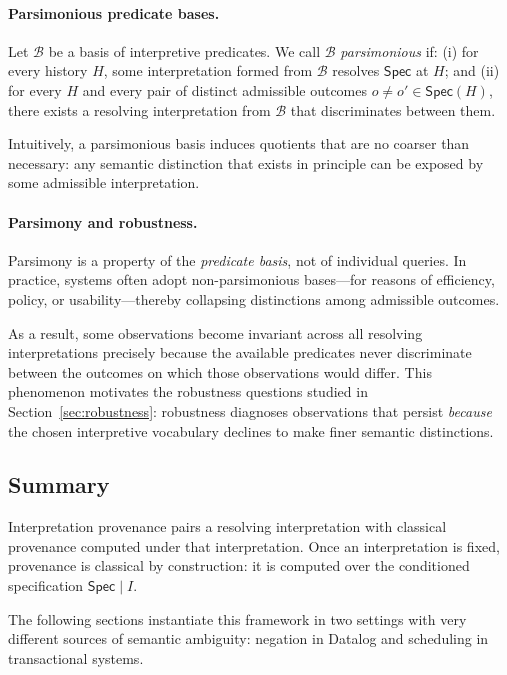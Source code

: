 \documentclass[acmsmall,nonacm]{acmart}
\theoremstyle{remark}
\numberwithin{definition}{section}
\numberwithin{theorem}{section}
\numberwithin{lemma}{section}
\numberwithin{corollary}{section}
\numberwithin{remark}{section}
\numberwithin{example}{section}
\numberwithin{observation}{section}
\numberwithin{assumption}{section}
\newcommand{\Spec}{\mathsf{Spec}}
\begin{document}
\paragraph{Parsimonious predicate bases.}
Let $\mathcal{B}$ be a basis of interpretive predicates.
We call $\mathcal{B}$ \emph{parsimonious} if:
(i) for every history $H$, some interpretation formed from $\mathcal{B}$
resolves $\Spec$ at $H$; and
(ii) for every $H$ and every pair of distinct admissible outcomes
$o \neq o' \in \Spec(H)$, there exists a resolving interpretation from
$\mathcal{B}$ that discriminates between them.

Intuitively, a parsimonious basis induces quotients that are no coarser than
necessary: any semantic distinction that exists in principle can be exposed by
some admissible interpretation.

\paragraph{Parsimony and robustness.}
Parsimony is a property of the \emph{predicate basis}, not of individual queries.
In practice, systems often adopt non-parsimonious bases—for reasons of efficiency,
policy, or usability—thereby collapsing distinctions among admissible outcomes.

As a result, some observations become invariant across all resolving
interpretations precisely because the available predicates never discriminate
between the outcomes on which those observations would differ.
This phenomenon motivates the robustness questions studied in
Section~\ref{sec:robustness}: robustness diagnoses observations that persist
\emph{because} the chosen interpretive vocabulary declines to make finer semantic
distinctions.

\subsection{Summary}

Interpretation provenance pairs a resolving interpretation with classical
provenance computed under that interpretation.
Once an interpretation is fixed, provenance is classical by construction: it is
computed over the conditioned specification $\Spec \mid I$.

The following sections instantiate this framework in two settings with very
different sources of semantic ambiguity: negation in Datalog and scheduling in
transactional systems.


\end{document}
